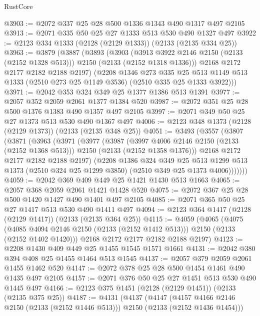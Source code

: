 \begin{lexlean}{RustCore}
\begin{coremodule}
@3903 := @2072 @337 @25 @28 @500 @1336 @1343 @490 @1317 @497 @2105
@3913 := @2071 @335 @50 @25 @27 @1333 @513 @530 @490 @1327 @497
@3922 := @2123 @334 @1333 (@2128 (@2129 @1333)) (@2133 (@2135 @334 @25))
@3963 := @3879
    (@3887
      (@3893
        (@3903
          (@3913 @3922 @2146 @2150 (@2133 (@2152 @1328 @513)))
          @2150
          (@2133 (@2152 @1318 @1336)))
        @2168
        @2172
        @2177
        @2182
        @2188
        @2197)
      (@2208
        @1346
        @273
        @335
        @25
        @513
        @1149
        @513
        @1333
        (@2510 @273 @25 @1149 @3536)
        (@2510 @335 @25 @1333 @3922)))
@3971 := @2042 @353 @324 @349 @25 @1377 @1386 @513 @1391
@3977 := @2057 @352 @2059 @2061 @1377 @1384 @520
@3987 := @2072 @351 @25 @28 @500 @1376 @1383 @490 @1357 @497 @2105
@3997 := @2071 @349 @50 @25 @27 @1373 @513 @530 @490 @1367 @497
@4006 := @2123 @348 @1373 (@2128 (@2129 @1373)) (@2133 (@2135 @348 @25))
@4051 := @3493
    (@3557
      (@3807
        (@3871
          (@3963
            (@3971
              (@3977
                (@3987
                  (@3997 @4006 @2146 @2150 (@2133 (@2152 @1368 @513)))
                  @2150
                  (@2133 (@2152 @1358 @1376)))
                @2168
                @2172
                @2177
                @2182
                @2188
                @2197)
              (@2208
                @1386
                @324
                @349
                @25
                @513
                @1299
                @513
                @1373
                (@2510 @324 @25 @1299 @3850)
                (@2510 @349 @25 @1373 @4006)))))))
@4059 := @2042 @369 @409 @449 @25 @1421 @1430 @513 @1663
@4065 := @2057 @368 @2059 @2061 @1421 @1428 @520
@4075 := @2072 @367 @25 @28 @500 @1420 @1427 @490 @1401 @497 @2105
@4085 := @2071 @365 @50 @25 @27 @1417 @513 @530 @490 @1411 @497
@4094 := @2123 @364 @1417 (@2128 (@2129 @1417)) (@2133 (@2135 @364 @25))
@4115 := @4059
    (@4065
      (@4075 (@4085 @4094 @2146 @2150 (@2133 (@2152 @1412 @513))) @2150 (@2133 (@2152 @1402 @1420)))
      @2168
      @2172
      @2177
      @2182
      @2188
      @2197)
@4123 := @2208 @1430 @409 @449 @25 @1455 @1545 @1571 @1661
@4131 := @2042 @380 @394 @408 @25 @1455 @1464 @513 @1545
@4137 := @2057 @379 @2059 @2061 @1455 @1462 @520
@4147 := @2072 @378 @25 @28 @500 @1454 @1461 @490 @1435 @497 @2105
@4157 := @2071 @376 @50 @25 @27 @1451 @513 @530 @490 @1445 @497
@4166 := @2123 @375 @1451 (@2128 (@2129 @1451)) (@2133 (@2135 @375 @25))
@4187 := @4131
    (@4137
      (@4147 (@4157 @4166 @2146 @2150 (@2133 (@2152 @1446 @513))) @2150 (@2133 (@2152 @1436 @1454)))

\end{coremodule}
\end{lexlean}
